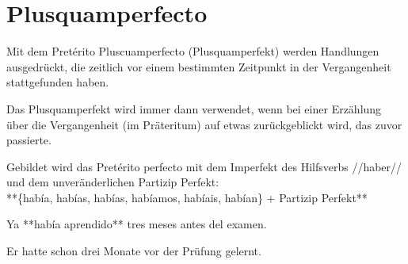 \section*{Plusquamperfecto}

\begin{highlight}
Mit dem Pretérito Pluscuamperfecto (Plusquamperfekt) werden  Handlungen ausgedrückt, die zeitlich vor einem
bestimmten Zeitpunkt in der Vergangenheit stattgefunden haben.
\end{highlight}

Das Plusquamperfekt wird immer dann verwendet, wenn bei einer Erzählung über die Vergangenheit
(im Präteritum) auf etwas zurückgeblickt wird, das zuvor passierte.

\begin{highlight}
Gebildet wird das Pretérito perfecto mit dem Imperfekt des Hilfsverbs //haber// und dem
unveränderlichen Partizip Perfekt:\\
**\{había, habías, habías, habíamos, habíais, habían\} + Partizip Perfekt**
\end{highlight}

\begin{compactitem}
    \item Ya **había aprendido** tres meses antes del examen.
    \begin{compactitem}\itshape
      \item Er hatte schon drei Monate vor der Prüfung gelernt.
    \end{compactitem}
\end{compactitem}

